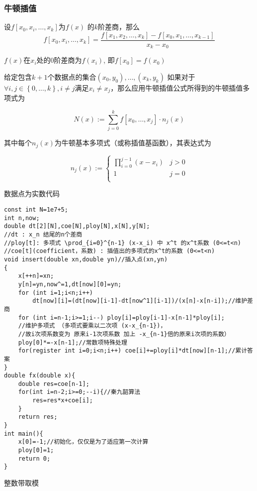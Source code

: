\documentclass[UTF8]{ctexart}
\begin{document}
\subsubsection{牛顿插值}

设$f[x_0,x_i,\dots,x_k]$为$f(x)$ 的$k$阶差商，那么
$$
f[x_0,x_i,\dots,x_k]=\frac{f[x_1,x_2,\dots,x_k]-f[x_0,x_1,\dots,x_{k-1}]}{x_k-x_0}
$$

$f(x)$在$x_i$处的0阶差商为$f(x_i)$, 即$f[x_0]=f(x_0)$

给定包含$k+1$个数据点的集合$(x_{0},y_{0}),\ldots ,(x_{k},y_{k})$
如果对于$\forall i,j\in \left\{0,...,k\right\},i\neq j$满足$x_i \neq x_j$，那么应用牛顿插值公式所得到的牛顿插值多项式为

$$
N(x):=\sum_{j=0}^{k}f[x_0,\dots,x_j]\cdot n_j(x)
$$

其中每个$n_{j}(x)$为牛顿基本多项式（或称插值基函数），其表达式为

$$
n_{j}(x):=
\left\{
    \begin{array}{lr}
    \prod\limits_{i=0}^{j-1} (x-x_i)&j>0\\
    1&j=0 \\
    \end{array}
\right.
$$

数据点为实数代码

\begin{lstlisting}
const int N=1e7+5;
int n,now;
double dt[2][N],coe[N],ploy[N],x[N],y[N];
//dt : x_n 结尾的n个差商
//ploy[t]: 多项式 \prod_{i=0}^{n-1} (x-x_i) 中 x^t 的x^t系数 (0<=t<n)
//coe[t](coefficient，系数) : 插值出的多项式的x^t的系数 (0<=t<n) 
void insert(double xn,double yn)//插入点(xn,yn) 
{
    x[++n]=xn;
    y[n]=yn,now^=1,dt[now][0]=yn;
    for (int i=1;i<n;i++) 
        dt[now][i]=(dt[now][i-1]-dt[now^1][i-1])/(x[n]-x[n-i]);//维护差商 
    for (int i=n-1;i>=1;i--) ploy[i]=ploy[i-1]-x[n-1]*ploy[i];
    //维护多项式 （多项式要乘以二次项 (x-x_{n-1})，
    //故i次项系数变为 原来i-1次项系数 加上 -x_{n-1}倍的原来i次项的系数） 
    ploy[0]*=-x[n-1];//常数项特殊处理 
    for(register int i=0;i<n;i++) coe[i]+=ploy[i]*dt[now][n-1];//累计答案 
}
double fx(double x){
    double res=coe[n-1];
    for(int i=n-2;i>=0;--i){//秦九韶算法 
        res=res*x+coe[i];
    }
    return res;
}
int main(){
    x[0]=-1;//初始化，仅仅是为了适应第一次计算 
    ploy[0]=1;
    return 0;
}
\end{lstlisting}

整数带取模
\end{document}
